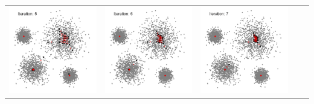\documentclass{beamer}
\begin{document}
\begin{frame}
{\begin{tabular}{ccccc}
	\includegraphics[scale=0.15]{meanshift/meanshift-14}&
	\includegraphics[scale=0.15]{meanshift/meanshift-16}&
	\includegraphics[scale=0.15]{meanshift/meanshift-18}&

\end{tabular}}
\end{frame}
\end{document}
